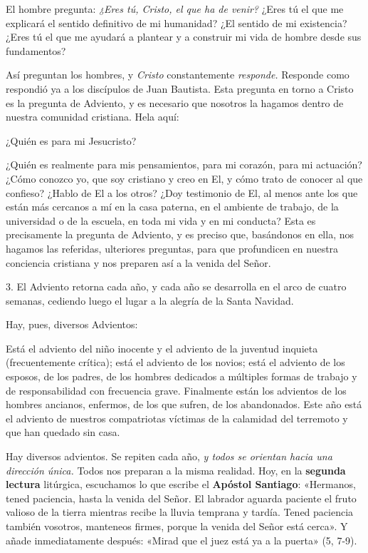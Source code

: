 \documentclass[]{article}
\begin{document}
El hombre pregunta: \emph{¿Eres tú, Cristo, el que ha de venir?} ¿Eres
tú el que me explicará el sentido definitivo de mi humanidad? ¿El
sentido de mi existencia? ¿Eres tú el que me ayudará a plantear y a
construir mi vida de hombre desde sus fundamentos?

Así preguntan los hombres, y \emph{Cristo} constantemente
\emph{responde.} Responde como respondió ya a los discípulos de Juan
Bautista. Esta pregunta en torno a Cristo es la pregunta de Adviento, y
es necesario que nosotros la hagamos dentro de nuestra comunidad
cristiana. Hela aquí:

¿Quién es para mi Jesucristo?

¿Quién es realmente para mis pensamientos, para mi corazón, para mi
actuación? ¿Cómo conozco yo, que soy cristiano y creo en El, y cómo
trato de conocer al que confieso? ¿Hablo de El a los otros? ¿Doy
testimonio de El, al menos ante los que están más cercanos a mí en la
casa paterna, en el ambiente de trabajo, de la universidad o de la
escuela, en toda mi vida y en mi conducta? Esta es precisamente la
pregunta de Adviento, y es preciso que, basándonos en ella, nos hagamos
las referidas, ulteriores preguntas, para que profundicen en nuestra
conciencia cristiana y nos preparen así a la venida del Señor.

3. El Adviento retorna cada año, y cada año se desarrolla en el arco de
cuatro semanas, cediendo luego el lugar a la alegría de la Santa
Navidad.

Hay, pues, diversos Advientos:

Está el adviento del niño inocente y el adviento de la juventud inquieta
(frecuentemente crítica); está el adviento de los novios; está el
adviento de los esposos, de los padres, de los hombres dedicados a
múltiples formas de trabajo y de responsabilidad con frecuencia grave.
Finalmente están los advientos de los hombres ancianos, enfermos, de los
que sufren, de los abandonados. Este año está el adviento de nuestros
compatriotas víctimas de la calamidad del terremoto y que han quedado
sin casa.

Hay diversos advientos. Se repiten cada año, \emph{y todos se orientan
hacia una dirección única.} Todos nos preparan a la misma realidad. Hoy,
en la \textbf{segunda lectura} litúrgica, escuchamos lo que escribe el
\textbf{Apóstol Santiago}: «Hermanos, tened paciencia, hasta la venida
del Señor. El labrador aguarda paciente el fruto valioso de la tierra
mientras recibe la lluvia temprana y tardía. Tened paciencia también
vosotros, manteneos firmes, porque la venida del Señor está cerca». Y
añade inmediatamente después: «Mirad que el juez está ya a la puerta»
(5, 7-9).
\end{document}
